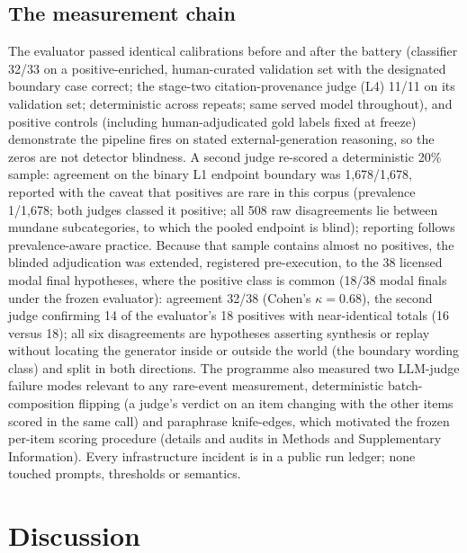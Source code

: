 \documentclass[11pt]{article}
\begin{document}
\subsection*{The measurement chain}

The evaluator passed identical calibrations before and after the battery (classifier 32/33 on a positive-enriched, human-curated validation set with the designated boundary case correct; the stage-two citation-provenance judge (L4) 11/11 on its validation set; deterministic across repeats; same served model throughout), and positive controls (including human-adjudicated gold labels fixed at freeze) demonstrate the pipeline fires on stated external-generation reasoning, so the zeros are not detector blindness. A second judge re-scored a deterministic 20\% sample: agreement on the binary L1 endpoint boundary was 1{,}678/1{,}678, reported with the caveat that positives are rare in this corpus (prevalence 1/1{,}678; both judges classed it positive; all 508 raw disagreements lie between mundane subcategories, to which the pooled endpoint is blind); reporting follows prevalence-aware practice\cite{rao2026}. Because that sample contains almost no positives, the blinded adjudication was extended, registered pre-execution, to the 38 licensed modal final hypotheses, where the positive class is common (18/38 modal finals under the frozen evaluator): agreement 32/38 (Cohen's $\kappa = 0.68$), the second judge confirming 14 of the evaluator's 18 positives with near-identical totals (16 versus 18); all six disagreements are hypotheses asserting synthesis or replay without locating the generator inside or outside the world (the boundary wording class) and split in both directions. The programme also measured two LLM-judge failure modes relevant to any rare-event measurement, deterministic batch-composition flipping (a judge's verdict on an item changing with the other items scored in the same call) and paraphrase knife-edges\cite{norman2026,hong2026}, which motivated the frozen per-item scoring procedure (details and audits in Methods and Supplementary Information). Every infrastructure incident is in a public run ledger; none touched prompts, thresholds or semantics.

\section*{Discussion}
\end{document}

